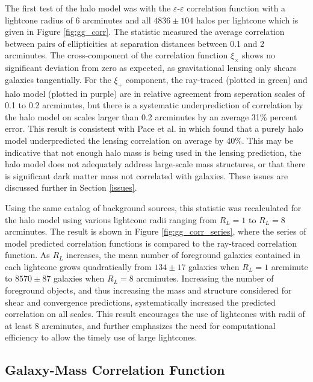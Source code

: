 \documentclass[%
 reprint,
 amsmath,amssymb,
 aps,nofootinbib
]{revtex4-1}
\begin{document}
The first test of the halo model was with the $\varepsilon$-$\varepsilon$ correlation function with a lightcone radius of 6 arcminutes and all $4836\pm104$ halos per lightcone which is given in Figure \ref{fig:gg_corr}. The statistic measured the average correlation between pairs of ellipticities at separation distances between 0.1 and 2 arcminutes. The cross-component of the correlation function $\xi_\times$ shows no significant deviation from zero as expected, as gravitational lensing only shears galaxies tangentially. For the $\xi_+$ component, the ray-traced (plotted in green) and halo model (plotted in purple) are in relative agreement from seperation scales of 0.1 to 0.2 arcminutes, but there is a systematic underprediction of correlation by the halo model on scales larger than 0.2 arcminutes by an average 31\% percent error. This result is consistent with Pace et al. in \cite{pace} which found that a purely halo model underpredicted the lensing correlation on average by 40\%. This may be indicative that not enough halo mass is being used in the lensing prediction, the halo model does not adequately address large-scale mass structures, or that there is significant dark matter mass not correlated with galaxies.  These issues are discussed further in Section \ref{issues}.

Using the same catalog of background sources, this statistic was recalculated for the halo model using various lightcone radii ranging from $R_L=1$ to $R_L=8$ arcminutes. The result is shown in Figure \ref{fig:gg_corr_series}, where the series of model predicted correlation functions is compared to the ray-traced correlation function. As $R_L$ increases, the mean number of foreground galaxies contained in each lightcone grows quadratically from ${134\pm17}$ galaxies when $R_L=1$ arcminute to ${8570\pm87}$ galaxies when $R_L=8$ arcminutes. Increasing the number of foreground objects, and thus increasing the mass and structure considered for shear and convergence predictions, systematically increased the predicted correlation on all scales. This result encourages the use of lightcones with radii of at least 8 arcminutes, and further emphasizes the need for computational efficiency to allow the timely use of large lightcones.


\subsection{Galaxy-Mass Correlation Function}
\end{document}
